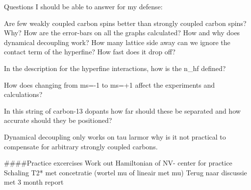 Questions I should be able to answer for my defense:

Are few weakly coupled carbon spins better than strongly coupled carbon spins? Why?
How are the error-bars on all the graphs calculated?
How and why does dynamical decoupling work?
How many lattice side away can we ignore the contact term of the hyperfine? How fast does it drop off?

In the description for the hyperfine interactions, how is the n_hf defined?

How does changing from ms=-1 to ms=+1 affect the experiments and calculations?

In this string of carbon-13  dopants how far should these be separated and how accurate should they be positioned?

Dynamical decoupling only works on tau larmor
why is it not practical to compensate for arbitrary strongly coupled carbons.



####Practice excercises
Work out Hamiltonian of NV- center for practice
Schaling T2* met concetratie (wortel mu of lineair met mu) Terug naar discussie met 3 month report
